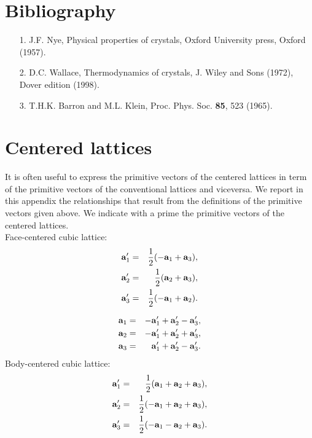 \documentclass[12pt,a4paper,twoside]{report}
\begin{document}
\newpage

{\color{dark-blue}\chapter{Bibliography}}
\color{black}

\begin{enumerate}


\item
[1.] J.F. Nye, Physical properties of crystals, Oxford University press, 
Oxford (1957).

\item
[2.] D.C. Wallace, Thermodynamics of crystals, J. Wiley and Sons (1972),
Dover edition (1998).

\item
[3.] T.H.K. Barron and M.L. Klein, Proc. Phys. Soc. {\bf 85}, 523 (1965).
\end{enumerate}

\newpage

\appendix
{\color{dark-blue}\chapter{Centered lattices}}
\color{black}

It is often useful to express the primitive vectors of the centered
lattices in term of the primitive vectors of the conventional lattices
and viceversa. We report in this appendix the relationships that result
from the definitions of the primitive vectors given above.
We indicate with a prime the primitive vectors of the centered lattices. \\
Face-centered cubic lattice:
\begin{eqnarray}
{\bf a}_1'&=&{1\over 2} (-{\bf a}_1 + {\bf a}_3), \\
{\bf a}_2'&=&{1\over 2} ({\bf a}_2 + {\bf a}_3), \\
{\bf a}_3'&=&{1\over 2} (-{\bf a}_1 + {\bf a}_2). 
\end{eqnarray}

\begin{eqnarray}
{\bf a}_1&=& -{\bf a}_1' + {\bf a}_2'- {\bf a}_3', \\
{\bf a}_2&=& -{\bf a}_1' + {\bf a}_2'+ {\bf a}_3', \\
{\bf a}_3&=& {\bf a}_1' + {\bf a}_2'- {\bf a}_3' .
\end{eqnarray}
Body-centered cubic lattice:
\begin{eqnarray}
{\bf a}_1'&=&{1\over 2} ({\bf a}_1 + {\bf a}_2 + {\bf a}_3), \\
{\bf a}_2'&=&{1\over 2} (-{\bf a}_1 + {\bf a}_2 + {\bf a}_3), \\
{\bf a}_3'&=&{1\over 2} (-{\bf a}_1 - {\bf a}_2 + {\bf a}_3). 
\end{eqnarray}
\end{document}

